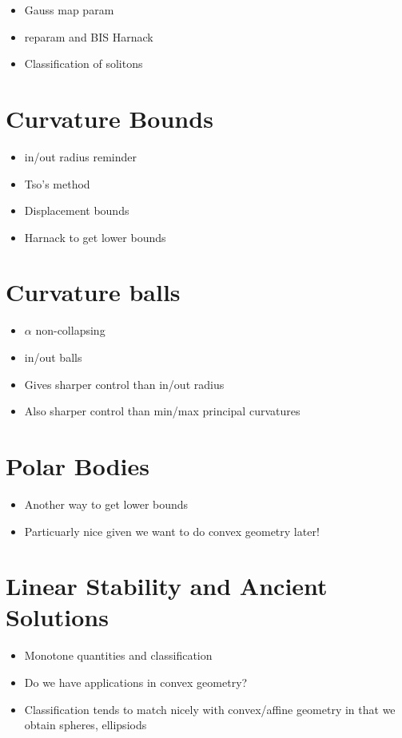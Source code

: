 \begin{itemize}
\item Gauss map param
\item reparam and BIS Harnack
\item Classification of solitons
\end{itemize}

\chapter{Curvature Bounds}

\begin{itemize}
\item in/out radius reminder
\item Tso's method
\item Displacement bounds
\item Harnack to get lower bounds
\end{itemize}

\chapter{Curvature balls}

\begin{itemize}
\item \(\alpha\) non-collapsing
\item in/out balls
\item Gives sharper control than in/out radius
\item Also sharper control than min/max principal curvatures
\end{itemize}

\chapter{Polar Bodies}

\begin{itemize}
\item Another way to get lower bounds
\item Particuarly nice given we want to do convex geometry later!
\end{itemize}

\chapter{Linear Stability and Ancient Solutions}

\begin{itemize}
\item Monotone quantities and classification
\item Do we have applications in convex geometry?
\item Classification tends to match nicely with convex/affine geometry in that we obtain spheres, ellipsiods
\end{itemize}

